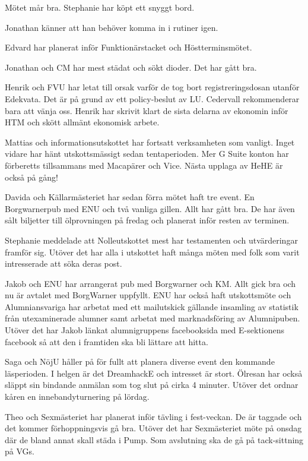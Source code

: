 \documentclass[10pt]{article}
\begin{document}
\begin{paragrafer}
\begin{fyllnadsval}
\end{fyllnadsval}

\begin{paragrafer}
Mötet mår bra. Stephanie har köpt ett snyggt bord.

Jonathan känner att han behöver komma in i rutiner igen. 

Edvard har planerat inför Funktionärstacket och Höstterminsmötet. 

Jonathan och CM har mest städat och sökt dioder. Det har gått bra.

Henrik och FVU har letat till orsak varför de tog bort registreringsdosan utanför Edekvata. Det är på grund av ett policy-beslut av LU. 
Cedervall rekommenderar bara att vänja oss.
Henrik har skrivit klart de sista delarna av ekonomin inför HTM och skött allmänt ekonomisk arbete. 

Mattias och informationsutskottet har fortsatt verksamheten som vanligt. Inget vidare har hänt utskottsmässigt sedan tentaperioden. Mer G Suite konton har förberetts tillsammans med Macapärer och Vice. Nästa upplaga av HeHE är också på gång!

Davida och Källarmästeriet har sedan förra mötet haft tre event. En Borgwarnerpub med ENU och två vanliga gillen. Allt har gått bra. De har även sålt biljetter till ölprovningen på fredag och planerat inför resten av terminen. 

Stephanie meddelade att Nolleutskottet mest har testamenten och utvärderingar framför sig. Utöver det har alla i utskottet haft många möten med folk som varit intresserade att söka deras post. 

Jakob och ENU har arrangerat pub med Borgwarner och KM. Allt gick bra och nu är avtalet med BorgWarner uppfyllt. ENU har också haft utskottsmöte och Alumniansvariga har arbetat med ett mailutskick gällande insamling av statistik från utexaminerade alumner samt arbetat med marknadsföring av Alumnipuben. 
Utöver det har Jakob länkat alumnigruppens facebooksida med E-sektionens facebook så att den i framtiden ska bli lättare att hitta. 

Saga och NöjU håller på för fullt att planera diverse event den kommande läsperioden. I helgen är det DreamhackE och intresset är stort. Ölresan har också släppt sin bindande anmälan som tog slut på cirka 4 minuter. Utöver det ordnar kåren en innebandyturnering på lördag. 

Theo och Sexmästeriet har planerat inför tävling i fest-veckan. De är taggade och det kommer förhoppningsvis gå bra. Utöver det har Sexmästeriet möte på onsdag där de bland annat skall städa i Pump. Som avslutning ska de gå på tack-sittning på VGs.



\end{paragrafer}
\end{paragrafer}
\end{document}
